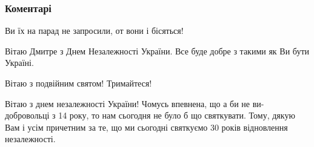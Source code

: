  
 
 
 
 
\subsubsection{Коментарі}
\label{sec:24_08_2021.fb.kuharchuk_dmitrij.1.birthday_nezalezhnist.cmt}

\begin{itemize}
 
Ви їх на парад не запросили, от вони і бісяться!

 
Вітаю Дмитре з Днем Незалежності України. Все буде добре з такими як Ви бути Україні.

 
Вітаю з подвійним святом! Тримайтеся!

 

Вітаю з днем незалежності України! Чомусь впевнена, що а би не ви- добровольці
з 14 року, то нам сьогодня не було б що святкувати. Тому, дякую Вам і усім
причетним за те, що ми сьогодні святкуємо 30 років відновлення незалежності.


\end{itemize}
